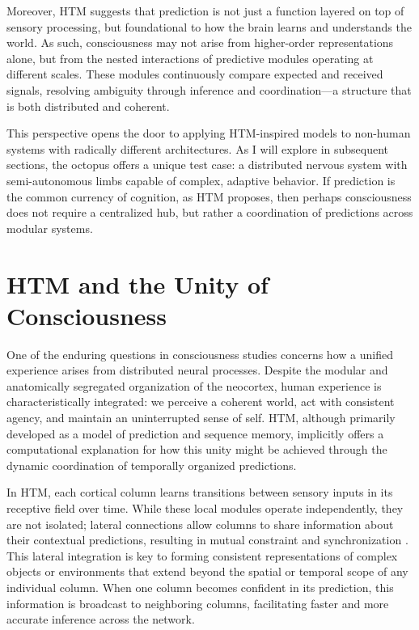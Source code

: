 \documentclass{article}
\begin{document}
Moreover, HTM suggests that prediction is not just a function layered on top of sensory processing, but foundational to how the brain learns and understands the world. As such, consciousness may not arise from higher-order representations alone, but from the nested interactions of predictive modules operating at different scales. These modules continuously compare expected and received signals, resolving ambiguity through inference and coordination---a structure that is both distributed and coherent.

This perspective opens the door to applying HTM-inspired models to non-human systems with radically different architectures. As I will explore in subsequent sections, the octopus offers a unique test case: a distributed nervous system with semi-autonomous limbs capable of complex, adaptive behavior. If prediction is the common currency of cognition, as HTM proposes, then perhaps consciousness does not require a centralized hub, but rather a coordination of predictions across modular systems.

\section{HTM and the Unity of Consciousness}

One of the enduring questions in consciousness studies concerns how a unified experience arises from distributed neural processes. Despite the modular and anatomically segregated organization of the neocortex, human experience is characteristically integrated: we perceive a coherent world, act with consistent agency, and maintain an uninterrupted sense of self. HTM, although primarily developed as a model of prediction and sequence memory, implicitly offers a computational explanation for how this unity might be achieved through the dynamic coordination of temporally organized predictions.

In HTM, each cortical column learns transitions between sensory inputs in its receptive field over time. While these local modules operate independently, they are not isolated; lateral connections allow columns to share information about their contextual predictions, resulting in mutual constraint and synchronization \parencite{hawkins2017theory}. This lateral integration is key to forming consistent representations of complex objects or environments that extend beyond the spatial or temporal scope of any individual column. When one column becomes confident in its prediction, this information is broadcast to neighboring columns, facilitating faster and more accurate inference across the network.
\end{document}

